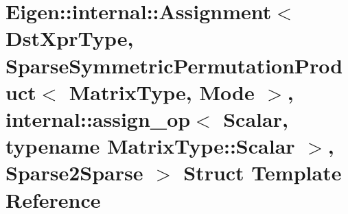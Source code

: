 \hypertarget{struct_eigen_1_1internal_1_1_assignment_3_01_dst_xpr_type_00_01_sparse_symmetric_permutation_pro69955201e4d84b32d17d1959c46119e9}{}\section{Eigen\+:\+:internal\+:\+:Assignment$<$ Dst\+Xpr\+Type, Sparse\+Symmetric\+Permutation\+Product$<$ Matrix\+Type, Mode $>$, internal\+:\+:assign\+\_\+op$<$ Scalar, typename Matrix\+Type\+:\+:Scalar $>$, Sparse2\+Sparse $>$ Struct Template Reference}
\label{struct_eigen_1_1internal_1_1_assignment_3_01_dst_xpr_type_00_01_sparse_symmetric_permutation_pro69955201e4d84b32d17d1959c46119e9}

